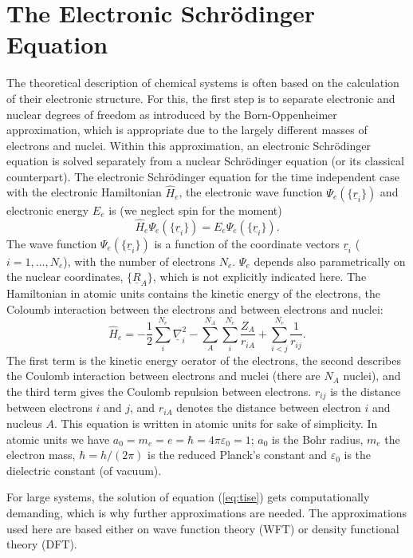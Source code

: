 \documentclass[11pt,DIV=13,BCOR=5mm,a4paper,headinclude]{scrbook}
\renewcommand{\vec}[1]{\underline{#1}}
\begin{document}
\section{The Electronic Schr\"{o}dinger Equation}
The theoretical description of chemical systems is often based on the calculation of their electronic structure.
For this, the first step is to separate electronic and nuclear degrees of freedom as introduced by the Born-Oppenheimer approximation\cite{bornoppenheimer}, which is appropriate due to the largely different masses of electrons and nuclei.
Within this approximation, an electronic Schrödinger equation is solved separately from a nuclear Schrödinger equation (or its classical counterpart).
The electronic Schrödinger equation for the time independent case  with the electronic Hamiltonian $\hat{H}_e$, the electronic wave function $\Psi_e(\{\vec{r}_i\})$ and electronic energy $E_e$ is (we neglect spin for the moment)
\begin{equation}\label{eq:tise}
 \hat{H}_e\Psi_e(\{\vec{r}_i\})=E_e\Psi_e(\{\vec{r}_i\}).
\end{equation}
The wave function $\Psi_e(\{\vec{r}_i\})$ is a function of the coordinate vectors $\vec{r}_i$ ($i=1,...,N_e$), with the number of electrons $N_e$.
$\Psi_e$ depends also parametrically on the nuclear coordinates, $\{\vec{R}_A\}$, which is not explicitly indicated here.
The Hamiltonian in atomic units contains the kinetic energy of the electrons, the Coloumb interaction between the electrons and between electrons and nuclei:
\begin{equation}
 \hat{H}_e= -\frac{1}{2}\sum_i^{N_e}\vec{\nabla}_i^2 - \sum_A^{N_A}\sum_i^{N_e}\frac{Z_A}{r_{iA}} + \sum_{i<j}^{N_e}\frac{1}{r_{ij}}.
\end{equation}
The first term is the kinetic energy oerator of the electrons, the second describes the Coulomb interaction between electrons and nuclei (there are $N_A$ nuclei), and the third term gives the Coulomb repulsion between electrons.
$r_{ij}$ is the distance between electrons $i$ and $j$, and $r_{iA}$ denotes the distance between electron $i$ and nucleus $A$.
This equation is written in atomic units for sake of simplicity.
In atomic units we have $a_0=m_e=e=\hbar=4\pi\varepsilon_0=1$; $a_0$ is the Bohr radius, $m_e$ the electron mass, $\hbar=h/(2\pi)$ is the reduced Planck's constant and $\varepsilon_0$ is the dielectric constant (of vacuum).

For large systems, %
the solution of equation (\ref{eq:tise}) gets computationally demanding, which is why further approximations are needed.
The approximations used here are based either on wave function theory (WFT) or density functional theory (DFT).
\end{document}

